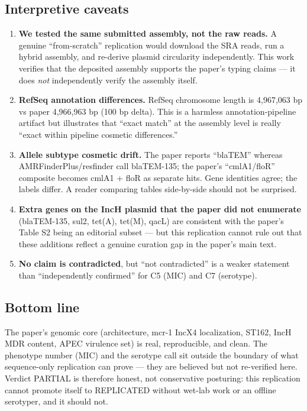 \documentclass[11pt,letterpaper]{article}
\begin{document}
\subsection*{Interpretive caveats}
\begin{enumerate}[leftmargin=1.5em]
  \item \textbf{We tested the same submitted assembly, not the raw reads.} A
        genuine ``from-scratch'' replication would download the SRA reads, run
        a hybrid assembly, and re-derive plasmid circularity independently.
        This work verifies that the deposited assembly supports the paper's
        typing claims --- it does \emph{not} independently verify the assembly
        itself.
  \item \textbf{RefSeq annotation differences.} RefSeq chromosome length is
        4{,}967{,}063 bp vs paper 4{,}966{,}963 bp (100 bp delta). This is a
        harmless annotation-pipeline artifact but illustrates that ``exact
        match'' at the assembly level is really ``exact within pipeline
        cosmetic differences.''
  \item \textbf{Allele subtype cosmetic drift.} The paper reports
        ``blaTEM'' whereas AMRFinderPlus/resfinder call blaTEM-135; the paper's
        ``cmlA1/floR'' composite becomes cmlA1 + floR as separate hits. Gene
        identities agree; the labels differ. A reader comparing tables
        side-by-side should not be surprised.
  \item \textbf{Extra genes on the IncH plasmid that the paper did not enumerate}
        (blaTEM-135, sul2, tet(A), tet(M), qacL) are consistent with the paper's
        Table S2 being an editorial subset --- but this replication cannot
        rule out that these additions reflect a genuine curation gap in the
        paper's main text.
  \item \textbf{No claim is contradicted}, but ``not contradicted'' is a weaker
        statement than ``independently confirmed'' for C5 (MIC) and C7
        (serotype).
\end{enumerate}

\subsection*{Bottom line}
The paper's genomic core (architecture, mcr-1 IncX4 localization, ST162, IncH
MDR content, APEC virulence set) is real, reproducible, and clean.
The phenotype number (MIC) and the serotype call sit outside the boundary of
what sequence-only replication can prove --- they are believed but not
re-verified here. Verdict PARTIAL is therefore honest, not conservative
posturing: this replication cannot promote itself to REPLICATED without wet-lab
work or an offline serotyper, and it should not.
\end{document}
